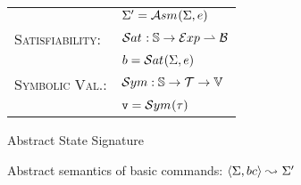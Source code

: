 \begin{figure}[h!]
\begin{tabular}{ll}
                                                    & $\Sigma' = \mathcal{A}{sm}_{}(\Sigma, e)$ \\[2pt]
%
\textsc{Satisfiability:}                   & $\mathcal{S}at_{} : \mathbb{S} \rightarrow \mathcal{E}xp \rightharpoonup \mathcal{B}$ \\ 
                                                    & $b = \mathcal{S}at_{}(\Sigma, e)$ \\[2pt]
%
\textsc{Symbolic Val.:}                 & $\mathcal{S}ym : \mathbb{S} \rightarrow \mathcal{T} \rightarrow \mathbb{V}$ \\ 
                                                    & $\mathtt{v} = \mathcal{S}ym_{}(\tau)$
 \end{tabular}
 \caption{Abstract State Signature}
 \end{figure}
 
 
 \begin{figure}[h!]
%
\caption{Abstract semantics of basic commands: {\small $\langle \Sigma, bc \rangle \leadsto_{} \Sigma'$}}
%
\end{figure}



